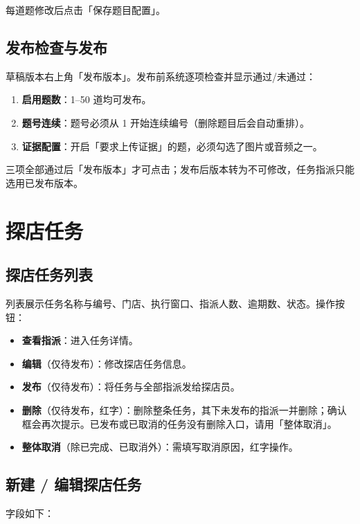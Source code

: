 \documentclass[12pt,a4paper,fontset=none]{ctexart}
\begin{document}

每道题修改后点击「保存题目配置」。

\subsection{发布检查与发布}
草稿版本右上角「发布版本」。发布前系统逐项检查并显示通过/未通过：

\begin{enumerate}
\item \textbf{启用题数}：1–50 道均可发布。
\item \textbf{题号连续}：题号必须从 1 开始连续编号（删除题目后会自动重排）。
\item \textbf{证据配置}：开启「要求上传证据」的题，必须勾选了图片或音频之一。
\end{enumerate}

三项全部通过后「发布版本」才可点击；发布后版本转为不可修改，任务指派只能选用已发布版本。

\section{探店任务}

\subsection{探店任务列表}
列表展示任务名称与编号、门店、执行窗口、指派人数、逾期数、状态。操作按钮：

\begin{itemize}
\item \textbf{查看指派}：进入任务详情。
\item \textbf{编辑}（仅待发布）：修改探店任务信息。
\item \textbf{发布}（仅待发布）：将任务与全部指派发给探店员。
\item \textbf{删除}（仅待发布，红字）：删除整条任务，其下未发布的指派一并删除；确认框会再次提示。已发布或已取消的任务没有删除入口，请用「整体取消」。
\item \textbf{整体取消}（除已完成、已取消外）：需填写取消原因，红字操作。
\end{itemize}


\subsection{新建 / 编辑探店任务}
字段如下：
\end{document}
